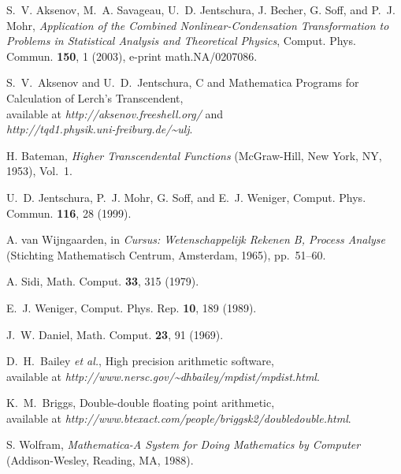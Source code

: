 \documentclass[11pt]{article}
\begin{document}
\begin{thebibliography}{10}


 S.~V. Aksenov, M.~A. Savageau, U.~D. Jentschura,
  J. Becher, G. Soff, and P.~J. Mohr, 
  {\em Application of the Combined Nonlinear-Condensation Transformation to Problems in Statistical Analysis and Theoretical Physics}, 
Comput. Phys. Commun. {\bf 150}, 1 (2003), e-print math.NA/0207086. 
  
S.~V.~Aksenov and U.~D.~Jentschura,
C and Mathematica Programs for Calculation of Lerch's Transcendent,\\
available at {\em http://aksenov.freeshell.org/} and\\
{\em http://tqd1.physik.uni-freiburg.de/\~{}ulj}.
  
H. Bateman, {\em Higher Transcendental Functions} (McGraw-Hill, New York, NY,
  1953), Vol.~1.
  
U.~D. Jentschura, P.~J. Mohr, G. Soff, and E.~J. Weniger, Comput. Phys. Commun.
  {\bf 116},  28  (1999).
  
A. van Wijngaarden, in {\em Cursus: Wetenschappelijk Rekenen B, Process
  Analyse} (Stichting Mathematisch Centrum, Amsterdam, 1965), pp.\ 51--60.

A. Sidi, Math. Comput. {\bf 33},  315  (1979).

E.~J. Weniger, Comput. Phys. Rep. {\bf 10},  189  (1989).

J.~W. Daniel, Math. Comput. {\bf 23},  91  (1969).

D.~H.~Bailey {\em et al.}, High precision arithmetic software, \\
available at {\em http://www.nersc.gov/\~{}dhbailey/mpdist/mpdist.html}.

K.~M.~Briggs, Double-double floating point arithmetic, \\
available at {\em http://www.btexact.com/people/briggsk2/doubledouble.html}.

S. Wolfram, {\em Mathematica-A System for Doing Mathematics by Computer}
  (Addison-Wesley, Reading, MA, 1988).

\end{thebibliography}
\end{document}
